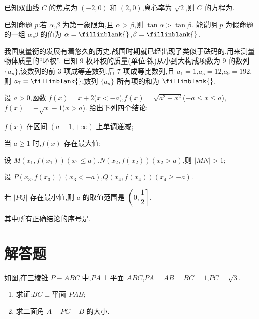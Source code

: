 \begin{problem}
已知双曲线 \(C\) 的焦点为 \((-2,0)\) 和 \((2,0)\),离心率为 \(\sqrt{2}\),则 \(C\) 的方程为\fillinblank{}.
\end{problem}

\begin{problem}
已知命题 \(p\):若 \(\alpha\),\(\beta\) 为第一象限角,且 \(\alpha>\beta\),则 \(\tan\alpha>\tan\beta\). 能说明 \(p\) 为假命题的一组 \(\alpha\),\(\beta\) 的值为 \(\alpha=\fillinblank{}\),\(\beta=\fillinblank{}\).
\end{problem}

\begin{problem}
我国度量衡的发展有着悠久的历史,战国时期就已经出现了类似于砝码的,用来测量物体质量的``环权''. 已知 9 枚环权的质量(单位:铢)从小到大构成项数为 9 的数列 \(\{a_n\}\),该数列的前 3 项成等差数列,后 7 项成等比数列,且 \(a_1=1\),\(a_5=12\),\(a_9=192\),则 \(a_7=\fillinblank{}\);数列 \(\{a_n\}\) 所有项的和为 \(\fillinblank{}\).
\end{problem}

\begin{problem}
设 \(a>0\),函数 \(f(x)=x+2\)(\(x<-a\)),\(f(x)=\sqrt{a^2-x^2}\)(\(-a\le x\le a\)),\(f(x)=-\sqrt{x}-1\)(\(x>a\)). 给出下列四个结论:

\begin{circlelist}
\item \(f(x)\) 在区间 \((a-1,+\infty)\) 上单调递减;

\item 当 \(a\ge 1\) 时,\(f(x)\) 存在最大值;

\item 设 \(M(x_1,f(x_1))(x_1\le a)\),\(N(x_2,f(x_2))(x_2>a)\),则 \(|MN|>1\);

\item 设 \(P(x_3,f(x_3))(x_3<-a)\),\(Q(x_4,f(x_4))(x_4\ge -a)\).
\end{circlelist}
若 \(|PQ|\) 存在最小值,则 \(a\) 的取值范围是 \(\left(0,\dfrac{1}{2}\right]\).

其中所有正确结论的序号是\fillinblank{}.
\end{problem}

\section{解答题}

\begin{problem}
如图,在三棱锥 \(P-ABC\) 中,\(PA\perp \text{平面 }ABC\),\(PA=AB=BC=1\),\(PC=\sqrt{3}\).

\begin{enumerate}
\item 求证:\(BC\perp \text{平面 }PAB\);
\item 求二面角 \(A-PC-B\) 的大小.
\end{enumerate}

\end{problem}

